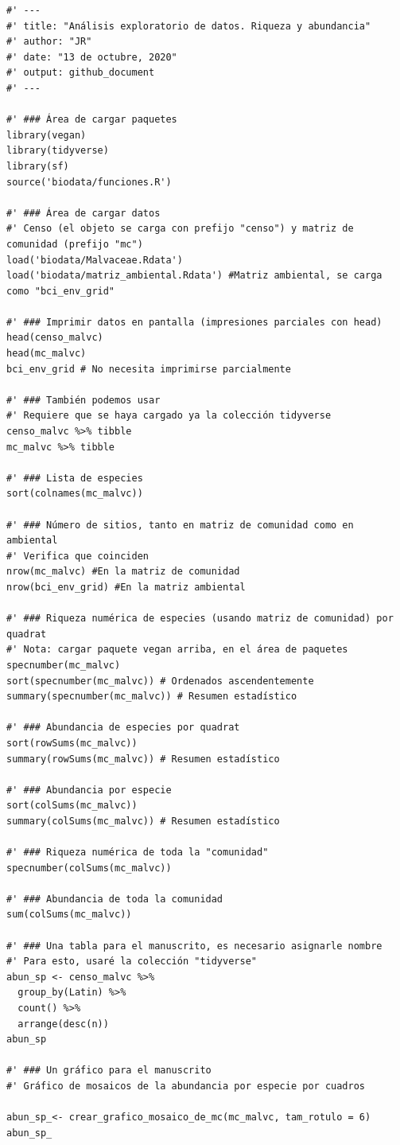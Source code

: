 \documentclass[11pt,]{article}
\begin{document}
\begin{verbatim}
#' ---
#' title: "Análisis exploratorio de datos. Riqueza y abundancia"
#' author: "JR"
#' date: "13 de octubre, 2020"
#' output: github_document
#' ---

#' ### Área de cargar paquetes
library(vegan)
library(tidyverse)
library(sf)
source('biodata/funciones.R')

#' ### Área de cargar datos
#' Censo (el objeto se carga con prefijo "censo") y matriz de comunidad (prefijo "mc")
load('biodata/Malvaceae.Rdata')
load('biodata/matriz_ambiental.Rdata') #Matriz ambiental, se carga como "bci_env_grid"

#' ### Imprimir datos en pantalla (impresiones parciales con head)
head(censo_malvc)
head(mc_malvc)
bci_env_grid # No necesita imprimirse parcialmente

#' ### También podemos usar
#' Requiere que se haya cargado ya la colección tidyverse
censo_malvc %>% tibble
mc_malvc %>% tibble

#' ### Lista de especies
sort(colnames(mc_malvc))

#' ### Número de sitios, tanto en matriz de comunidad como en ambiental
#' Verifica que coinciden
nrow(mc_malvc) #En la matriz de comunidad
nrow(bci_env_grid) #En la matriz ambiental

#' ### Riqueza numérica de especies (usando matriz de comunidad) por quadrat
#' Nota: cargar paquete vegan arriba, en el área de paquetes
specnumber(mc_malvc)
sort(specnumber(mc_malvc)) # Ordenados ascendentemente
summary(specnumber(mc_malvc)) # Resumen estadístico

#' ### Abundancia de especies por quadrat
sort(rowSums(mc_malvc))
summary(rowSums(mc_malvc)) # Resumen estadístico

#' ### Abundancia por especie
sort(colSums(mc_malvc))
summary(colSums(mc_malvc)) # Resumen estadístico

#' ### Riqueza numérica de toda la "comunidad"
specnumber(colSums(mc_malvc))

#' ### Abundancia de toda la comunidad
sum(colSums(mc_malvc))

#' ### Una tabla para el manuscrito, es necesario asignarle nombre
#' Para esto, usaré la colección "tidyverse"
abun_sp <- censo_malvc %>%
  group_by(Latin) %>% 
  count() %>% 
  arrange(desc(n))
abun_sp

#' ### Un gráfico para el manuscrito
#' Gráfico de mosaicos de la abundancia por especie por cuadros

abun_sp_<- crear_grafico_mosaico_de_mc(mc_malvc, tam_rotulo = 6)
abun_sp_

\end{verbatim}
\end{document}
